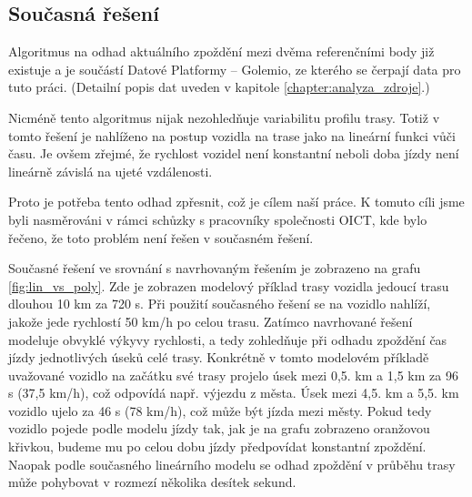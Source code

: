 \subsection{Současná řešení} \label{subsection:soucasna_reseni_odhadu}

Algoritmus na odhad aktuálního zpoždění mezi dvěma referenčními body již existuje a je součástí Datové Platformy -- Golemio, ze kterého se čerpají data pro tuto práci. (Detailní popis dat uveden v kapitole \ref{chapter:analyza_zdroje}.)

\bigbreak

Nicméně tento algoritmus nijak nezohledňuje variabilitu profilu trasy. Totiž v tomto řešení je nahlíženo na postup vozidla na trase jako na lineární funkci vůči času. Je ovšem zřejmé, že rychlost vozidel není konstantní neboli doba jízdy není lineárně závislá na ujeté vzdálenosti.

\bigbreak

Proto je potřeba tento odhad zpřesnit, což je cílem naší práce. K tomuto cíli jsme byli nasměrováni v rámci schůzky s pracovníky společnosti OICT, kde bylo řečeno, že toto problém není řešen v současném řešení.

\bigbreak

Současné řešení ve srovnání s navrhovaným řešením je zobrazeno na grafu \ref{fig:lin_vs_poly}. Zde je zobrazen modelový příklad trasy vozidla jedoucí trasu dlouhou 10 km za 720 s. Při použití současného řešení se na vozidlo nahlíží, jakože jede rychlostí 50 km/h po celou trasu. Zatímco navrhované řešení modeluje obvyklé výkyvy rychlosti, a tedy zohledňuje při odhadu zpoždění čas jízdy jednotlivých úseků celé trasy. Konkrétně v tomto modelovém příkladě uvažované vozidlo na začátku své trasy projelo úsek mezi 0,5. km a 1,5 km za 96 s (37,5 km/h), což odpovídá např. výjezdu z města. Úsek mezi 4,5. km a 5,5. km vozidlo ujelo za 46 s (78 km/h), což může být jízda mezi městy. Pokud tedy vozidlo pojede podle modelu jízdy tak, jak je na grafu zobrazeno oranžovou křivkou, budeme mu po celou dobu jízdy předpovídat konstantní zpoždění. Naopak podle současného lineárního modelu se odhad zpoždění v průběhu trasy může pohybovat v rozmezí několika desítek sekund.

